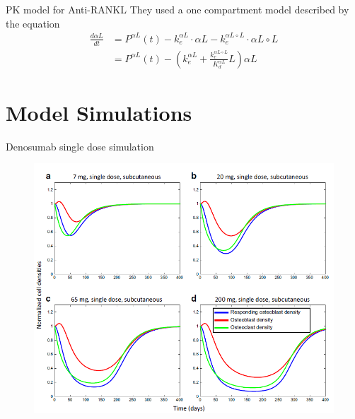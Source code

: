 \documentclass{beamer}
\begin{document}
\begin{frame}{PK model for Anti-RANKL}
They used a one compartment model described by the equation
\begin{equation}
	\begin{split}
	\frac{d\alpha L}{dt}&= P^{\alpha L}(t)- k_e^{\alpha L} \cdot \alpha L - k_e^{\alpha L \circ L} \cdot \alpha L \circ L\\
	&=P^{\alpha L}(t)- \left( 
	k_e^{\alpha L}  + \frac{k_e^{\alpha L \circ L}}{K_d^{\alpha L}} L  \right) \alpha L 
	\end{split}
\end{equation}

\end{frame}

\section{Model Simulations}


\begin{frame}{Denosumab single dose simulation}
\begin{figure}[h]
		\centering
			\includegraphics[scale=0.45]{../Figures/fig_lemaire_fig14.png}
	\end{figure}	
\end{frame}	
\end{document}
